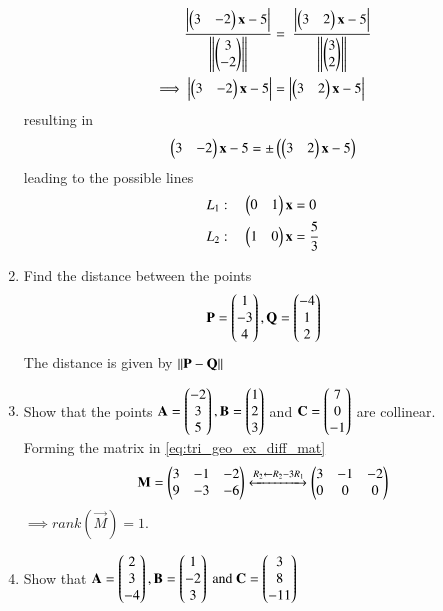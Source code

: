 \begin{enumerate}[label=\arabic*.,ref=\thesubsection.\theenumi]
%
\begin{align}
\frac{\left\vert\begin{pmatrix}3 & -2\end{pmatrix}\mathbf{x}  - 5\right\vert}{\left\lVert\begin{pmatrix}3 \\ -2\end{pmatrix}\right\rVert}
&=\
\frac{\left\vert\begin{pmatrix}3 & 2\end{pmatrix}\mathbf{x}  - 5\right\vert}{\left\lVert\begin{pmatrix}3 \\ 2\end{pmatrix}\right\rVert}
\\
\implies \left\vert\begin{pmatrix}3 & -2\end{pmatrix}\mathbf{x}  - 5\right\vert&=\left\vert\begin{pmatrix}3 & 2\end{pmatrix}\mathbf{x}  - 5\right\vert
\end{align}
%
resulting in 
%
\begin{align}
\begin{pmatrix}3 & -2\end{pmatrix}\mathbf{x}  - 5=\pm\left(\begin{pmatrix}3 & 2\end{pmatrix}\mathbf{x}  - 5\right)
\end{align}
%
leading to the possible lines
%
\begin{align}
L_1: \quad \begin{pmatrix}0 & 1\end{pmatrix}\mathbf{x}  &=0
\\
L_2: \quad \begin{pmatrix}1 & 0\end{pmatrix}\mathbf{x}  &=  \frac{5}{3}
\end{align}
%
\item Find the distance between the points
%
\begin{align}
\mathbf{P} = \begin{pmatrix}1\\-3\\4\end{pmatrix},
\mathbf{Q} = \begin{pmatrix}-4\\1\\2\end{pmatrix}
\end{align}
%
\solution The distance is given by $\left\lVert\mathbf{P}-\mathbf{Q}\right\rVert$
\item Show that the points 
\label{prob:line_coll_3d}
$
\mathbf{A}=\begin{pmatrix}-2\\3\\5\end{pmatrix}, 
\mathbf{B}=\begin{pmatrix}1\\2\\3\end{pmatrix}$ 
and 
$ \mathbf{C}=\begin{pmatrix}7\\0\\-1\end{pmatrix}$ 
are collinear.
%
\\
\solution Forming the matrix in \eqref{eq:tri_geo_ex_diff_mat}
%
\begin{align}
\mathbf{M} = \begin{pmatrix}
3 & -1 & -2
\\
9 & -3 & -6
\end{pmatrix}
\xleftrightarrow {R_2\leftarrow R_2-3R_1}
\begin{pmatrix}
3 & -1 & -2
\\
0 & 0 & 0
\end{pmatrix}
\end{align}
%
$\implies rank(\vec{M}) = 1$.
%
\item Show that 
$
\mathbf{A}=\begin{pmatrix}2\\3\\-4\end{pmatrix}, 
\mathbf{B}=\begin{pmatrix}1\\-2\\3\end{pmatrix} \text{ and } 
\mathbf{C}=\begin{pmatrix}3\\8\\-11\end{pmatrix}$  

\end{enumerate}
